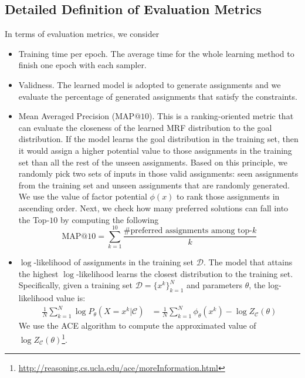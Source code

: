 \subsection{Detailed Definition of Evaluation Metrics}
In terms of evaluation metrics, we consider
\begin{itemize}
    \item Training time per epoch. The average time for the whole learning method to
          finish one epoch with each sampler.
    \item Validness. The learned model is adopted to generate assignments and we evaluate
          the percentage of generated assignments that satisfy the constraints.
    \item  Mean Averaged Precision (MAP$@10$). This is a ranking-oriented metric that can
          evaluate the closeness of the learned MRF distribution to the goal
          distribution. If the model learns the goal distribution in the training set,
          then it would assign a higher potential value to those assignments in the
          training set than all the rest of the unseen assignments. Based on this principle, we
          randomly pick two sets of inputs in those valid assignments: seen assignments
          from the training set and unseen assignments that are randomly generated. We
          use the value of factor potential $\phi(x)$ to rank those assignments in
          ascending order. Next, we check how many preferred solutions can fall into the
          Top-$10$ by computing the following
          \begin{equation*}
              \text{MAP}@10=\sum_{k=1}^{10}\frac{\#\text{preferred assignments among top-} k}{k}
          \end{equation*}

    \item $\log$-likelihood of assignments in the training set $\mathcal{D}$. The model that attains the highest $\log$-likelihood learns the closest  distribution to the training set.  Specifically, given a training set $\mathcal{D}=\{x^k\}_{k=1}^N$ and parameters $\theta$, the log-likelihood value is:
          \begin{equation}
              \begin{aligned}
                  {\frac{1}{N}\sum_{k=1}^N\log P_{\theta}(X=x^k|\mathcal{C})} & =\frac{1}{N}\sum_{k=1}^N\phi_\theta(x^k)- \log Z_\mathcal{C}(\theta)
              \end{aligned}
          \end{equation}
          We use the ACE algorithm to compute the approximated value of $\log Z_\mathcal{C}(\theta) $\footnote{\url{http://reasoning.cs.ucla.edu/ace/moreInformation.html}}.


\end{itemize}
